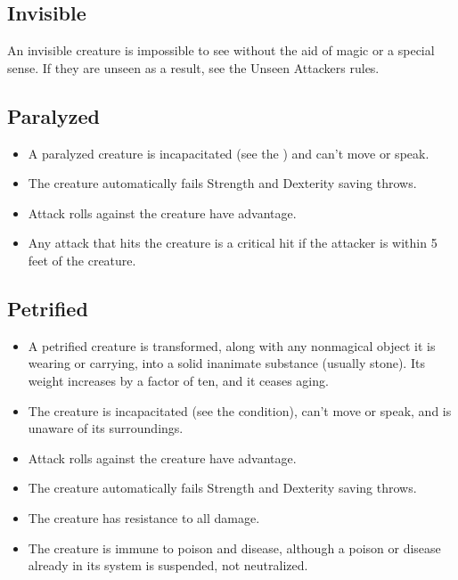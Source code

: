 \subsection{Invisible\label{condition:invisible}}
An invisible creature is impossible to see without the aid of magic or a special sense. If they are unseen as a result, see the Unseen Attackers rules. 

\subsection{Paralyzed\label{condition:paralyzed}}
\begin{itemize}
\item A paralyzed creature is incapacitated (see the ) and can't move or speak.
\item The creature automatically fails Strength and Dexterity saving throws.
\item Attack rolls against the creature have advantage.
\item Any attack that hits the creature is a critical hit if the attacker is within 5 feet of the creature.
\end{itemize}

\subsection{Petrified\label{condition:petrified}}
\begin{itemize}
\item A petrified creature is transformed, along with any nonmagical object it is wearing or carrying, into a solid inanimate substance (usually stone). Its weight increases by a factor of ten, and it ceases aging.
\item The creature is incapacitated (see the condition), can't move or speak, and is unaware of its surroundings.
\item Attack rolls against the creature have advantage.
\item The creature automatically fails Strength and Dexterity saving throws.
\item The creature has resistance to all damage.
\item The creature is immune to poison and disease, although a poison or disease already in its system is suspended, not neutralized.
\end{itemize}

